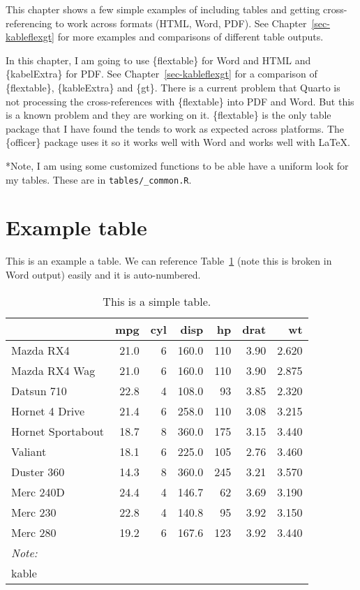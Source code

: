 \documentclass[
  letterpaper,
  oneside]{scrbook}
\begin{document}
This chapter shows a few simple examples of including tables and getting
cross-referencing to work across formats (HTML, Word, PDF). See
Chapter~\ref{sec-kableflexgt} for more examples and comparisons of
different table outputs.

In this chapter, I am going to use \{flextable\} for Word and HTML and
\{kabelExtra\} for PDF. See Chapter~\ref{sec-kableflexgt} for a
comparison of \{flextable\}, \{kableExtra\} and \{gt\}. There is a
current problem that Quarto is not processing the cross-references with
\{flextable\} into PDF and Word. But this is a known problem and they
are working on it. \{flextable\} is the only table package that I have
found the tends to work as expected across platforms. The \{officer\}
package uses it so it works well with Word and works well with LaTeX.

*Note, I am using some customized functions to be able have a uniform
look for my tables. These are in \texttt{tables/\_common.R}.

\hypertarget{example-table}{%
\section{Example table}\label{example-table}}

This is an example a table. We can reference Table~\ref{tbl-example}
(note this is broken in Word output) easily and it is auto-numbered.

\hypertarget{tbl-example}{}
\begin{table}
\caption{\label{tbl-example}This is a simple table. }\tabularnewline

\centering
\begin{tabular}[t]{lrrrrrr}
\toprule
  & mpg & cyl & disp & hp & drat & wt\\
\midrule
Mazda RX4 & 21.0 & 6 & 160.0 & 110 & 3.90 & 2.620\\
Mazda RX4 Wag & 21.0 & 6 & 160.0 & 110 & 3.90 & 2.875\\
Datsun 710 & 22.8 & 4 & 108.0 & 93 & 3.85 & 2.320\\
Hornet 4 Drive & 21.4 & 6 & 258.0 & 110 & 3.08 & 3.215\\
Hornet Sportabout & 18.7 & 8 & 360.0 & 175 & 3.15 & 3.440\\
\addlinespace
Valiant & 18.1 & 6 & 225.0 & 105 & 2.76 & 3.460\\
Duster 360 & 14.3 & 8 & 360.0 & 245 & 3.21 & 3.570\\
Merc 240D & 24.4 & 4 & 146.7 & 62 & 3.69 & 3.190\\
Merc 230 & 22.8 & 4 & 140.8 & 95 & 3.92 & 3.150\\
Merc 280 & 19.2 & 6 & 167.6 & 123 & 3.92 & 3.440\\
\bottomrule
\multicolumn{7}{l}{\rule{0pt}{1em}\textit{Note: }}\\
\multicolumn{7}{l}{\rule{0pt}{1em}kable}\\
\end{tabular}
\end{table}
\end{document}
